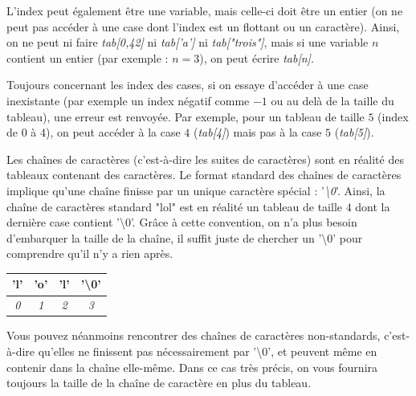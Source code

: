 \documentclass[11pt,a4paper]{article}
\begin{document}
\bigskip

L'index peut également être une variable, mais celle-ci doit être un entier (on ne peut pas accéder à une case dont l'index est un flottant ou un caractère).
Ainsi, on ne peut ni faire \textit{tab[0,42]} ni \textit{tab['a']} ni \textit{tab["trois"]}, mais si une variable $ n $ contient un entier (par exemple : $ n = 3 $), on peut écrire \textit{tab[n]}.

\bigskip

Toujours concernant les index des cases, si on essaye d'accéder à une case inexistante (par exemple un index négatif comme $ -1 $ ou au delà de la taille du tableau), une erreur est renvoyée.
Par exemple, pour un tableau de taille $ 5 $ (index de 0 à 4), on peut accéder à la case $ 4 $ (\textit{tab[4]}) mais pas à la case $ 5 $ (\textit{tab[5]}).

\bigskip

Les chaînes de caractères (c'est-à-dire les suites de caractères) sont en réalité des tableaux contenant des caractères.
Le format standard des chaînes de caractères implique qu'une chaîne finisse par un unique caractère spécial : '\textit{\textbackslash 0}'.
Ainsi, la chaîne de caractères standard "lol" est en réalité un tableau de taille $ 4 $ dont la dernière case contient '\textbackslash 0'.
Grâce à cette convention, on n'a plus besoin d'embarquer la taille de la chaîne, il suffit juste de chercher un '\textbackslash 0' pour comprendre qu'il n'y a rien après.

\bigskip

\begin{table}[h!]
  \centering
  \begin{tabular}{| c | c | c | c |}
  \hline
'l' & 'o' & 'l' & '\textbackslash 0' \\
  \hline
\textit{0} & \textit{1} & \textit{2} & \textit{3} \\
  \hline
  \end{tabular}
\end{table}

\bigskip

Vous pouvez néanmoins rencontrer des chaînes de caractères non-standards, c'est-à-dire qu'elles ne finissent pas nécessairement par '\textbackslash 0', et peuvent même en contenir dans la chaîne elle-même.
Dans ce cas très précis, on vous fournira toujours la taille de la chaîne de caractère en plus du tableau.

\bigskip
\end{document}
